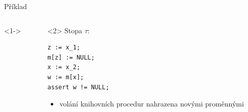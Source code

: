 \documentclass[11pt]{beamer}
\begin{document}
\begin{frame}[fragile]{Příklad}
\begin{columns}

\begin{column}{0.5\textwidth}<1->
\end{column}

\begin{column}{0.5\textwidth}<2>
Stopa $\tau$:
\begin{lstlisting}
z := x_1;
m[z] := NULL;
x := x_2;
w := m[x];
assert w != NULL;
\end{lstlisting}

\begin{itemize}
\item volání knihovních procedur nahrazena novými proměnnými
\end{itemize}


\end{column}

\end{columns}
\end{frame}
\end{document}
